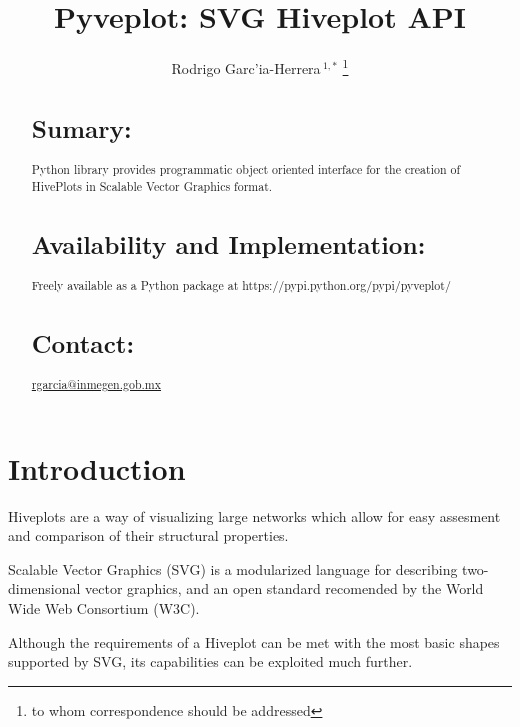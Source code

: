 \documentclass{bioinfo}
\begin{document}

\title[short Title]{Pyveplot: SVG Hiveplot API}
\author[Sample \textit{et~al}]{Rodrigo Garc'ia-Herrera\,$^{1,*}$ \footnote{to whom correspondence should be addressed}}
\address{$^{1}$Department of Bioinformatics, Mexican Institute of
  Genomic Medicine}



\maketitle

\begin{abstract}

\section{Sumary:}
Python library provides programmatic object oriented interface for the creation of
HivePlots in Scalable Vector Graphics format.
\section{Availability and Implementation:}
Freely available as a Python package at
https://pypi.python.org/pypi/pyveplot/

\section{Contact:} \href{rgarcia@inmegen.gob.mx}{rgarcia@inmegen.gob.mx}
\end{abstract}

\section{Introduction}

Hiveplots are a way of visualizing large networks which allow
for easy assesment and comparison of their structural properties. \citealp{Boffelli03}

Scalable Vector Graphics (SVG) is a modularized language for
describing two-dimensional vector graphics, and an open standard
recomended by the World Wide Web Consortium (W3C).
\citealp{McCormack:11:SVG} 


Although the requirements of a Hiveplot can be met
with the most basic shapes supported by SVG, its capabilities can
be exploited much further.
\end{document}
